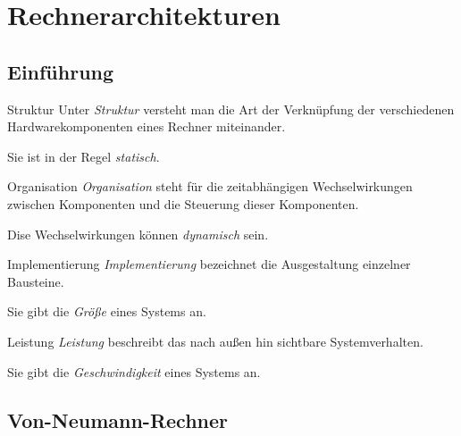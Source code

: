 \section{Rechnerarchitekturen}

\subsection{Einführung}

\begin{defi}{Struktur}
    Unter \emph{Struktur} versteht man die Art der Verknüpfung der verschiedenen Hardwarekomponenten eines Rechner miteinander.

    Sie ist in der Regel \emph{statisch}.
\end{defi}

\begin{defi}{Organisation}
    \emph{Organisation} steht für die zeitabhängigen Wechselwirkungen zwischen Komponenten und die Steuerung dieser Komponenten.

    Dise Wechselwirkungen können \emph{dynamisch} sein.
\end{defi}

\begin{defi}{Implementierung}
    \emph{Implementierung} bezeichnet die Ausgestaltung einzelner Bausteine.

    Sie gibt die \emph{Größe} eines Systems an.
\end{defi}

\begin{defi}{Leistung}
    \emph{Leistung} beschreibt das nach außen hin sichtbare Systemverhalten.

    Sie gibt die \emph{Geschwindigkeit} eines Systems an.
\end{defi}

\subsection{Von-Neumann-Rechner}

